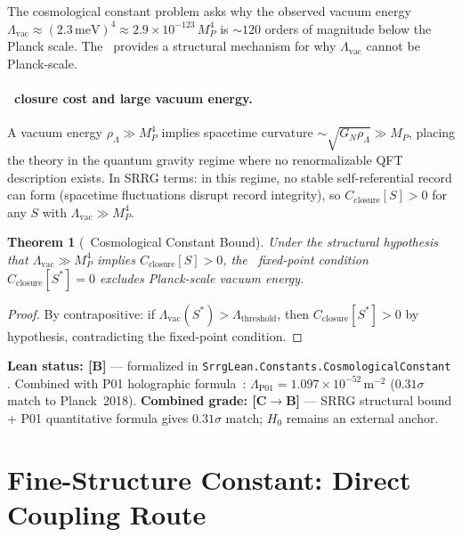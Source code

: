 \documentclass[11pt]{article}
\newtheorem{theorem}{Theorem}[section]
\theoremstyle{remark}
\newcommand{\SRRG}{\text{SRRG}}
\newcommand{\lean}[1]{%
  \penalty-100
  \begingroup
  \def\_{\textunderscore\allowbreak}%
  \texttt{#1}%
  \endgroup
}
\newcommand{\Sstar}{S^*}
\begin{document}
\begin{appendices}
The cosmological constant problem asks why the observed vacuum energy
$\Lambda_{\mathrm{vac}} \approx (2.3\,\text{meV})^4 \approx 2.9\times10^{-123}\,M_P^4$
is $\sim 120$ orders of magnitude below the Planck scale.  The \SRRG\ provides a
structural mechanism for why $\Lambda_{\mathrm{vac}}$ cannot be Planck-scale.

\paragraph{\SRRG\ closure cost and large vacuum energy.}
A vacuum energy $\rho_\Lambda \gg M_P^4$ implies spacetime curvature
$\sim \sqrt{G_N\rho_\Lambda} \gg M_P$, placing the theory in the quantum gravity
regime where no renormalizable QFT description exists.  In SRRG terms: in this
regime, no stable self-referential record can form
(spacetime fluctuations disrupt record integrity), so $C_{\mathrm{closure}}[S] > 0$
for any $S$ with $\Lambda_{\mathrm{vac}} \gg M_P^4$.

\begin{theorem}[\SRRG\ Cosmological Constant Bound]
\label{thm:cc_bound_app}
Under the structural hypothesis that $\Lambda_{\mathrm{vac}} \gg M_P^4$ implies
$C_{\mathrm{closure}}[S] > 0$, the \SRRG\ fixed-point condition
$C_{\mathrm{closure}}[\Sstar] = 0$ excludes Planck-scale vacuum energy.
\end{theorem}

\begin{proof}
By contrapositive: if $\Lambda_{\mathrm{vac}}(\Sstar) > \Lambda_{\mathrm{threshold}}$,
then $C_{\mathrm{closure}}[\Sstar] > 0$ by hypothesis, contradicting the fixed-point
condition.
\end{proof}

\textbf{Lean status: [B]} --- formalized in
\lean{SrrgLean.Constants.CosmologicalConstant}.
Combined with P01 holographic formula~\cite{Spivack2025_FirstPrinciplesSM}:
$\Lambda_{\mathrm{P01}} = 1.097\times10^{-52}\,\text{m}^{-2}$ ($0.31\sigma$ match
to Planck~2018).
\textbf{Combined grade: [C$\to$B]} --- SRRG structural bound + P01 quantitative
formula gives $0.31\sigma$ match; $H_0$ remains an external anchor.

\section{Fine-Structure Constant: Direct Coupling Route}
\label{app:alpha_coupling}


\end{appendices}
\end{document}
